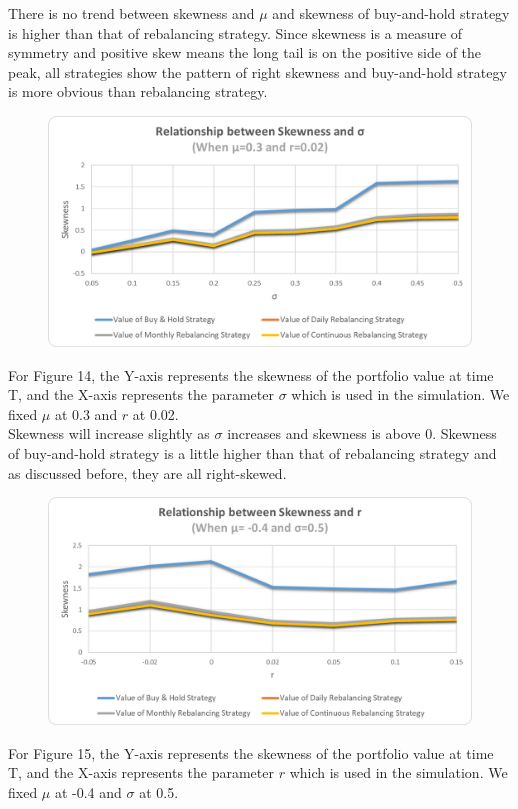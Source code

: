 \documentclass[
10pt, %
a4paper, %
oneside, %
headinclude,footinclude, %
BCOR5mm, %
]{scrartcl}
\begin{document}
There is no trend between skewness and $\mu$ and skewness of buy-and-hold strategy is higher than that of rebalancing strategy. Since skewness is a measure of symmetry and positive skew means the long tail is on the positive side of the peak, all strategies show the pattern of right skewness and buy-and-hold strategy is more obvious than rebalancing strategy.\\

\begin{figure}[H]
	\centering
	\includegraphics[width=0.7\linewidth]{skew_sigma_030_002}
	\caption{}
	\label{fig:skewsigma030002}
\end{figure}
For Figure 14, the Y-axis represents the skewness of the portfolio value at time T, and the X-axis represents the parameter $\sigma$ which is used in the simulation. We fixed $\mu$ at 0.3 and $r$ at 0.02.\\

Skewness will increase slightly as $\sigma$ increases and skewness is above 0. Skewness of buy-and-hold strategy is a little higher than that of rebalancing strategy and as discussed before, they are all right-skewed.\\

\begin{figure}[H]
	\centering
	\includegraphics[width=0.7\linewidth]{skew_r_-040_050}
	\caption{}
	\label{fig:skewr-040050}
\end{figure}
For Figure 15, the Y-axis represents the skewness of the portfolio value at time T, and the X-axis represents the parameter $r$ which is used in the simulation. We fixed $\mu$ at -0.4 and $\sigma$ at 0.5.\\
\end{document}
